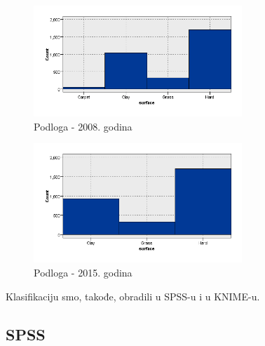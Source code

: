 \documentclass[a4paper]{article}
\begin{document}
\begin{figure}[H]
	\begin{center}
		\includegraphics[width=0.7\textwidth]{Klasifikacija/HistogramiPodlogaTerena/Graphboard2008.png}
	\end{center}
	\caption{Podloga - 2008. godina}
	\label{fig:Podloga2008}
\end{figure}
\begin{figure}[H]
	\begin{center}
		\includegraphics[width=0.7\textwidth]{Klasifikacija/HistogramiPodlogaTerena/Graphboard2015.png}
	\end{center}
	\caption{Podloga - 2015. godina}
	\label{fig:Podloga2015}
\end{figure}

Klasifikaciju smo, takođe, obradili u SPSS-u i u KNIME-u.

\restoregeometry
\subsection{SPSS}
\end{document}
